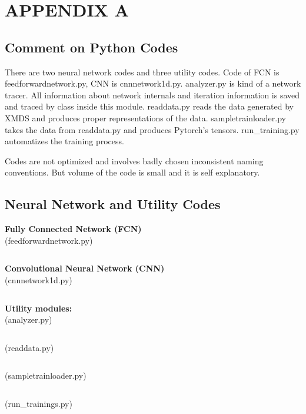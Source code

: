 \documentclass[a4paper,times,12pt]{article}
\begin{document}
\section{APPENDIX A}

\subsection{Comment on Python Codes}

There are two neural network codes and three utility codes. Code of FCN is feedforwardnetwork.py, CNN is cnnnetwork1d.py. analyzer.py is kind of a network tracer. All information about network internals and iteration information is saved and traced by class inside this module. readdata.py reads the data generated by XMDS and produces proper representations of the data. sampletrainloader.py takes the data from readdata.py and produces Pytorch's tensors. run\_training.py automatizes the training process. 


Codes are not optimized and involves badly chosen inconsistent naming conventions. But volume of the code is small and it is self explanatory.

\subsection{Neural Network and Utility Codes}

\textbf{Fully Connected Network (FCN)}\\
(feedforwardnetwork.py)
\inputminted[breaklines]{python}{../Src/feedforwardnetwork.py}

\noindent \textbf{Convolutional Neural Network (CNN)}\\
(cnnnetwork1d.py) 
\inputminted[breaklines]{python}{../Src/cnnnetwork1d.py}

\noindent \textbf{Utility modules:}\\
(analyzer.py)
\inputminted[breaklines]{python}{../Src/analyzer.py}

\noindent (readdata.py)
\inputminted[breaklines]{python}{../Src/readdata.py}

\noindent (sampletrainloader.py)
\inputminted[breaklines]{python}{../Src/sampletrainloader.py}

\noindent (run\_trainings.py)
\inputminted[breaklines]{python}{../Src/run_trainings.py}

\newpage
\end{document}
